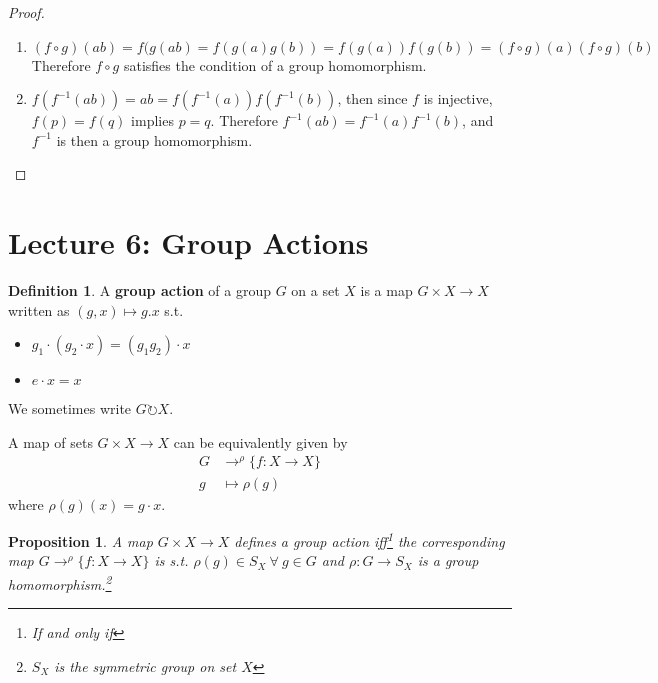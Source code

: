 \documentclass{article}
\newtheorem{theorem}{Proposition}[section]
\theoremstyle{definition}
\newtheorem{definition}{Definition}[section]
\theoremstyle{remark}
\begin{document}
\begin{proof}~
	\begin{enumerate}
		\item $ (f\circ g)(ab)=f(g(ab)=f(g(a)g(b))=f(g(a))f(g(b))=(f\circ g)(a)(f\circ g)(b)$\\
		      Therefore $f\circ g$ satisfies the condition of a group homomorphism.
		\item $f(f^{-1}(ab))=ab=f(f^{-1}(a))f(f^{-1}(b))$, then since $f$ is injective, $f(p)=f(q)$ implies $p=q$. Therefore $f^{-1}(ab)=f^{-1}(a)f^{-1}(b)$, and $f^{-1}$ is then a group homomorphism.
	\end{enumerate}
\end{proof}
\newpage
\section{Lecture 6: Group Actions}
\begin{definition}
	A \textbf{group action} of a group $G$ on a set $X$ is a map $G\times X\rightarrow X$ written as $(g,x)\mapsto g.x$ s.t.
	\begin{itemize}
		\item $g_1\cdot (g_2\cdot x)=(g_1g_2)\cdot x$
		\item $e\cdot x = x$
	\end{itemize}
	We sometimes write $G\circlearrowright X$.\\
\end{definition}
A map of sets $G\times X\rightarrow X$ can be equivalently given by
\begin{align*}
	G & \rightarrow^{\rho}\lbrace f:X\rightarrow X\rbrace \\
	g & \mapsto\rho(g)
\end{align*}
where $\rho(g)(x)=g\cdot x$.\\
\begin{theorem}
	A map $G\times X\rightarrow X$ defines a group action iff\footnote{If and only if} the corresponding map $G\rightarrow^{\rho}\lbrace f:X\rightarrow X\rbrace$ is s.t. $\rho(g)\in S_X ~\forall~g\in G$ and $\rho:G\rightarrow S_X$ is a group homomorphism.\footnote{$S_X$ is the symmetric group on set $X$}
\end{theorem}
\end{document}

